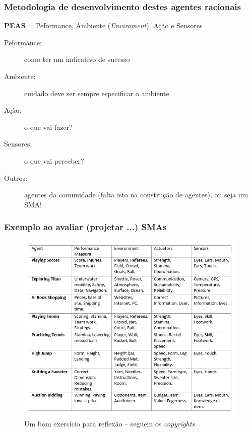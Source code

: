 \begin{frame}%

   \frametitle{Metodologia de desenvolvimento destes agentes racionais}
  \begin{block}{\textbf{PEAS} = Peformance, Ambiente (\textit{Enviroment}), Ação e Sensores}
  
   \begin{description}
  
     \item[Peformance:] como ter um indicativo de sucesso
     
    \item[Ambiente:]  cuidado deve ser sempre 
especificar o ambiente
          
   \item[Ação:] o que vai fazer?
                          
  \item[Sensores:] o que vai perceber?

  \item[Outros:] agentes da comunidade (falta isto na construção de agentes), ou seja um SMA!

          
   \end{description}
  \end{block}    
   
\end{frame}




\begin{frame} %

 \frametitle{Exemplo ao avaliar (projetar ...) SMAs}

\begin{figure}[!ht]
  \centering
  \includegraphics[height =.7\textheight,width=.8\textwidth]
  {figuras/PEAS01.png}
  \caption{Um bom exercício para reflexão -- seguem os \textit{copyrights}}
\end{figure}

\end{frame}


